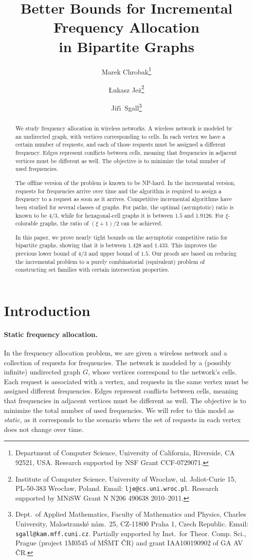 \documentclass[11pt]{article}
\title{Better Bounds for Incremental Frequency Allocation\\
in Bipartite Graphs}
\author{Marek Chrobak\thanks{Department of Computer Science,
       University of California,
       Riverside, CA 92521, USA.
       Research supported by NSF Grant CCF-0729071.
       }
\and
	{\L}ukasz Je{\.z}\thanks{Institute of Computer Science,
		University of Wroc{\l}aw,
		ul. Joliot-Curie 15, PL-50-383 Wroc{\l}aw, Poland.
		Email: {\tt lje@cs.uni.wroc.pl}.
		Research supported by MNiSW Grant N N206 490638 2010--2011.
	}
\and
		Ji\v{r}\'\i\ Sgall\thanks{Dept.\ of Applied Mathematics, Faculty of Mathematics and Physics,
Charles University, Malostransk\'e n\'am.\ 25, CZ-11800 Praha 1, Czech
Republic. 
Email: {\tt sgall@kam.mff.cuni.cz}.
Partially supported by Inst.\ for Theor. Comp. Sci.,
Prague (project 1M0545 of M\v{S}MT \v{C}R)
and grant IAA100190902 of GA AV \v{C}R.
		}
   }
\newcommand{\NP}{{\textsf{NP}}}
\begin{document}
\maketitle

\begin{abstract}
We study frequency allocation in wireless networks.
A wireless network is modeled by an undirected graph, with vertices
corresponding to cells. In each vertex we have a certain number of
requests, and each of those requests must be assigned a different frequency.
Edges represent conflicts between cells, meaning that frequencies in
adjacent vertices must be different as well. The objective is to
minimize the total number of used frequencies.

The offline version of the problem is known to be {\NP}-hard. In
the incremental version, requests for frequencies arrive over time and 
the algorithm is required to assign a frequency to a request
as soon as it arrives. Competitive incremental algorithms have
been studied for several classes of graphs. For paths,
the optimal (asymptotic) ratio is known to be $4/3$,
while for hexagonal-cell graphs it is between $1.5$ and $1.9126$. 
For $\xi$-colorable graphs, the ratio of $(\xi+1)/2$ can be achieved. 

In this paper, we prove nearly tight bounds on the asymptotic
competitive ratio for bipartite graphs, showing that it is between $1.428$ 
and $1.433$. This improves the previous lower bound of $4/3$ and upper
bound of $1.5$.
Our proofs are based on reducing the incremental problem to a purely 
combinatorial (equivalent) problem of 
constructing set families with certain intersection properties.
\end{abstract}




\section{Introduction}
\label{sec: introduction}

\paragraph{Static frequency allocation.}
In the frequency allocation problem, we are given a wireless network
and a collection of requests for frequencies. The network is 
modeled by a (possibly infinite) undirected graph $G$, whose vertices
correspond to the network's cells. Each request is associated with a vertex, 
and requests in the same vertex must be assigned different frequencies.
Edges represent conflicts between cells, meaning that frequencies in
adjacent vertices must be different as well. The objective is to
minimize the total number of used frequencies.
We will refer to this model as \emph{static}, as it
corresponds to the scenario where the set of
requests in each vertex does not change over time.
\end{document}
